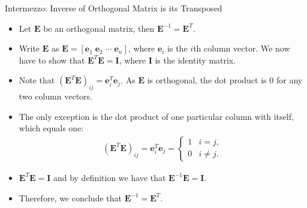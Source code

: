 \begin{frame}{Intermezzo: Inverse of Orthogonal Matrix is its Transposed}
	\begin{itemize}
		\item Let $\mathbf{E}$ be an orthogonal matrix, then $\mathbf{E}^{-1} = 
		\mathbf{E}^T$.
		\item Write $\mathbf{E}$ as $\mathbf{E} = [\mathbf{e}_1 \; \mathbf{e}_2 
		\; \cdots \; \mathbf{e}_n]$, where $\mathbf{e}_i$ is the $i$th column 
		vector. We now have to show that $\mathbf{E}^T\mathbf{E} = \mathbf{I}$, 
		where $\mathbf{I}$ is the identity matrix.
		\item Note that $(\mathbf{E}^T\mathbf{E})_{ij} = 
		\mathbf{e}_i^T\mathbf{e}_j$. As $\mathbf{E}$ is orthogonal, the dot 
		product is $0$ for any two column vectors. \item The only exception is 
		the dot product of one particular column with itself, \\
		which equals one:
		\begin{align}
			(\mathbf{E}^T\mathbf{E})_{ij} = \mathbf{e}_i^T\mathbf{e}_j =
			\begin{cases}
				1 & i=j,      \\
				0 & i \neq j. 
			\end{cases}
		\end{align}
		\item $\mathbf{E}^T\mathbf{E} = \mathbf{I}$ and by definition we have 
		that $\mathbf{E}^{-1}\mathbf{E} = \mathbf{I}$.
		\item Therefore, we conclude that $\mathbf{E}^{-1} = \mathbf{E}^T$.
	\end{itemize}
\end{frame}

